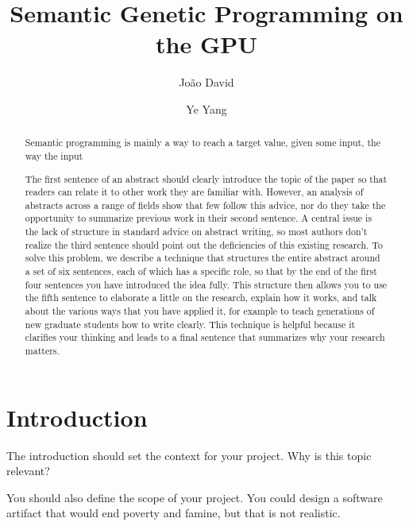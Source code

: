 \documentclass[runningheads]{llncs}
\begin{document}
\title{Semantic Genetic Programming on the GPU}
\author{João David \and
Ye Yang
}


\maketitle

\begin{abstract}
Semantic programming is mainly a way to reach a target value, given some input, the way the input 


The first sentence of an abstract should clearly introduce the topic of the paper so that readers can relate it to other work they are familiar with. However, an analysis of abstracts across a range of fields show that few follow this advice, nor do they take the opportunity to summarize previous work in their second sentence. A central issue is the lack of structure in standard advice on abstract writing, so most authors don’t realize the third sentence should point out the deficiencies of this existing research. To solve this problem, we describe a technique that structures the entire abstract around a set of six sentences, each of which has a specific role, so that by the end of the first four sentences you have introduced the idea fully. This structure then allows you to use the fifth sentence to elaborate a little on the research, explain how it works, and talk about the various ways that you have applied it, for example to teach generations of new graduate students how to write clearly. This technique is helpful because it clarifies your thinking and leads to a final sentence that summarizes why your research matters.

\end{abstract}
%
%
%
\section{Introduction}


The introduction should set the context for your project. Why is this topic relevant?

You should also define the scope of your project. You could design a software artifact that would end poverty and famine, but that is not realistic.
\end{document}
